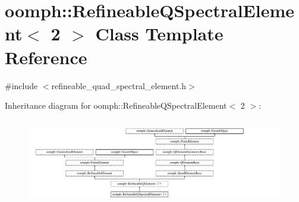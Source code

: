 \hypertarget{classoomph_1_1RefineableQSpectralElement_3_012_01_4}{}\section{oomph\+:\+:Refineable\+Q\+Spectral\+Element$<$ 2 $>$ Class Template Reference}
\label{classoomph_1_1RefineableQSpectralElement_3_012_01_4}


{\ttfamily \#include $<$refineable\+\_\+quad\+\_\+spectral\+\_\+element.\+h$>$}

Inheritance diagram for oomph\+:\+:Refineable\+Q\+Spectral\+Element$<$ 2 $>$\+:\begin{figure}[H]
\begin{center}
\leavevmode
\includegraphics[height=3.843138cm]{classoomph_1_1RefineableQSpectralElement_3_012_01_4}
\end{center}
\end{figure}
